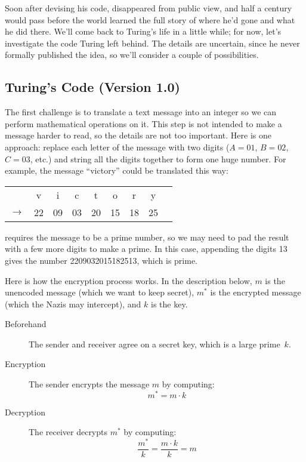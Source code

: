 Soon after devising his code,  disappeared from public view,
and half a century would pass before the world learned the full story of
where he'd gone and what he did there.  We'll come back to Turing's life
in a little while; for now, let's investigate the code Turing left behind.
The details are uncertain, since he never formally published the idea, so
we'll consider a couple of possibilities.

\subsection{Turing's Code (Version 1.0)}

The first challenge is to translate a text message into an integer so
we can perform mathematical operations on it.  This step is not
intended to make a message harder to read, so the details are not too
important.  Here is one approach: replace each letter of the message
with two digits ($A = 01$, $B = 02$, $C = 03$, etc.) and string all
the digits together to form one huge number.  For example, the message
``victory'' could be translated this way:
%
\begin{center}
\begin{tabular}{ccccccccc}
   &v &  i &  c &  t & o & r & y \\
$\rightarrow$ & 22 & 09 & 03 & 20 & 15 & 18 & 25
\end{tabular}
\end{center}
%
 requires the message to be a prime number, so we may
need to pad the result with a few more digits to make a prime.  In
this case, appending the digits 13 gives the number 2209032015182513,
which is prime.

Here is how the encryption process works.  In the description
below, $m$ is the unencoded message (which we want to keep secret),
$m^*$ is the encrypted message (which the Nazis may intercept), and
$k$ is the key.

\begin{description}

\item[Beforehand] The sender and receiver agree on a secret key, which
is a large prime~$k$.

\item[Encryption] The sender encrypts the message $m$ by computing:
\[
m^* = m \cdot k
\]

\item[Decryption] The receiver decrypts $m^*$ by computing:
\[
\frac{m^*}{k} = \frac{m \cdot k}{k} = m
\]

\end{description}

